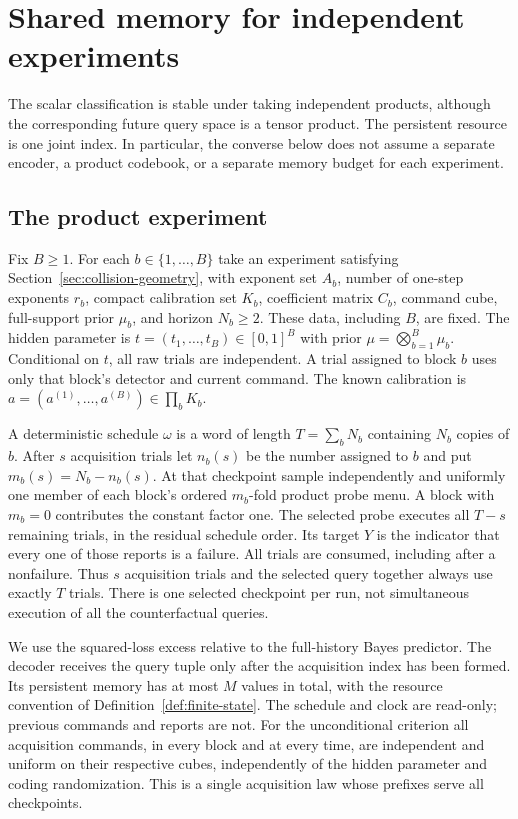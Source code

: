 \section{Shared memory for independent experiments}\label{sec:shared-memory}
The scalar classification is stable under taking independent products,
although the corresponding future query space is a tensor product. The
persistent resource is one joint index. In particular, the converse below
does not assume a separate encoder, a product codebook, or a separate
memory budget for each experiment.

\subsection{The product experiment}
Fix $B\ge1$. For each $b\in\{1,\ldots,B\}$ take an experiment satisfying
Section~\ref{sec:collision-geometry}, with exponent set $A_b$, number of
one-step exponents $r_b$, compact calibration set $K_b$, coefficient
matrix $C_b$, command cube, full-support prior $\mu_b$, and horizon
$N_b\ge2$. These data, including $B$, are fixed. The hidden parameter is
$t=(t_1,\ldots,t_B)\in[0,1]^B$ with prior
$\mu=\bigotimes_{b=1}^B\mu_b$. Conditional on $t$, all raw trials are
independent. A trial assigned to block $b$ uses only that block's detector
and current command. The known calibration is
$a=(a^{(1)},\ldots,a^{(B)})\in\prod_bK_b$.

A deterministic schedule $\omega$ is a word of length
$T=\sum_bN_b$ containing $N_b$ copies of $b$. After $s$ acquisition
trials let $n_b(s)$ be the number assigned to $b$ and put
$m_b(s)=N_b-n_b(s)$. At that checkpoint sample independently and uniformly
one member of each block's ordered $m_b$-fold product probe menu. A block
with $m_b=0$ contributes the constant factor one. The selected probe
executes all $T-s$ remaining trials, in the residual schedule order. Its
target $Y$ is the indicator that every one of those reports is a failure.
All trials are consumed, including after a nonfailure. Thus $s$ acquisition
trials and the selected query together always use exactly $T$ trials.
There is one selected checkpoint per run, not simultaneous execution of
all the counterfactual queries.

We use the squared-loss excess relative to the full-history Bayes
predictor. The decoder receives the query tuple only after the acquisition
index has been formed. Its persistent memory has at most $M$ values in
total, with the resource convention of Definition~\ref{def:finite-state}.
The schedule and clock are read-only; previous commands and reports are
not. For the unconditional criterion all acquisition commands, in every
block and at every time, are independent and uniform on their respective
cubes, independently of the hidden parameter and coding randomization.
This is a single acquisition law whose prefixes serve all checkpoints.

